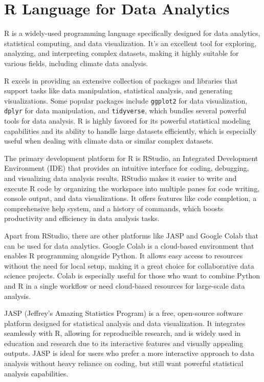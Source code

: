 \section{R Language for Data Analytics}

R is a widely-used programming language specifically designed for data analytics, statistical computing, and data visualization. It’s an excellent tool for exploring, analyzing, and interpreting complex datasets, making it highly suitable for various fields, including climate data analysis.

R excels in providing an extensive collection of packages and libraries that support tasks like data manipulation, statistical analysis, and generating visualizations. Some popular packages include \texttt{ggplot2} for data visualization, \texttt{dplyr} for data manipulation, and \texttt{tidyverse}, which bundles several powerful tools for data analysis. R is highly favored for its powerful statistical modeling capabilities and its ability to handle large datasets efficiently, which is especially useful when dealing with climate data or similar complex datasets.

The primary development platform for R is RStudio, an Integrated Development Environment (IDE) that provides an intuitive interface for coding, debugging, and visualizing data analysis results. RStudio makes it easier to write and execute R code by organizing the workspace into multiple panes for code writing, console output, and data visualizations. It offers features like code completion, a comprehensive help system, and a history of commands, which boosts productivity and efficiency in data analysis tasks.

Apart from RStudio, there are other platforms like JASP and Google Colab that can be used for data analytics. Google Colab is a cloud-based environment that enables R programming alongside Python. It allows easy access to resources without the need for local setup, making it a great choice for collaborative data science projects. Colab is especially useful for those who want to combine Python and R in a single workflow or need cloud-based resources for large-scale data analysis.

JASP (Jeffrey’s Amazing Statistics Program) is a free, open-source software platform designed for statistical analysis and data visualization. It integrates seamlessly with R, allowing for reproducible research, and is widely used in education and research due to its interactive features and visually appealing outputs. JASP is ideal for users who prefer a more interactive approach to data analysis without heavy reliance on coding, but still want powerful statistical analysis capabilities.

